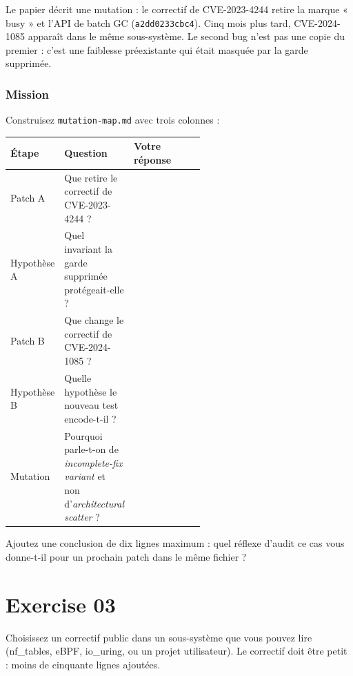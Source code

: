 \documentclass{training}
\begin{document}
Le papier décrit une mutation : le correctif de CVE-2023-4244 retire la
marque « busy » et l'API de batch GC
(\texttt{a2dd0233cbc4}). Cinq mois plus tard, CVE-2024-1085 apparaît dans le
même sous-système. Le second bug n'est pas une copie du premier : c'est une
faiblesse préexistante qui était masquée par la garde supprimée.

\subsection*{Mission}

Construisez \texttt{mutation-map.md} avec trois colonnes :

\begin{center}
\begin{tabularx}{\linewidth}{|p{0.22\linewidth}|p{0.34\linewidth}|X|}
\hline
\textbf{Étape} & \textbf{Question} & \textbf{Votre réponse} \\ \hline
Patch A & Que retire le correctif de CVE-2023-4244 ? & \\ \hline
Hypothèse A & Quel invariant la garde supprimée protégeait-elle ? & \\ \hline
Patch B & Que change le correctif de CVE-2024-1085 ? & \\ \hline
Hypothèse B & Quelle hypothèse le nouveau test encode-t-il ? & \\ \hline
Mutation & Pourquoi parle-t-on de \emph{incomplete-fix variant} et non d'\emph{architectural scatter} ? & \\ \hline
\end{tabularx}
\end{center}

Ajoutez une conclusion de dix lignes maximum : quel réflexe d'audit ce cas
vous donne-t-il pour un prochain patch dans le même fichier ?


\chapter{Exercise 03}
\makeheaderfiles

Choisissez un correctif public dans un sous-système que vous pouvez lire
(nf\_tables, eBPF, io\_uring, ou un projet utilisateur). Le correctif doit
être petit : moins de cinquante lignes ajoutées.
\end{document}
